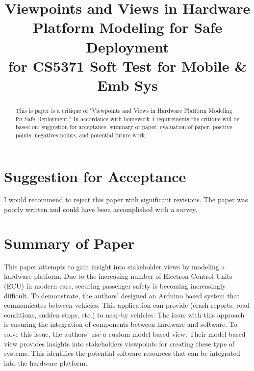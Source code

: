\documentclass[conference]{IEEEtran}
\begin{document}
\title{Viewpoints and Views in Hardware Platform Modeling for Safe Deployment\\
for CS5371 Soft Test for Mobile \& Emb Sys}

\author{
}

\maketitle

\begin{abstract}
This is paper is a critique of "Viewpoints and Views in Hardware Platform Modeling for Safe Deployment." In accordance with homework 4 requirements the critique will be based on: suggestion for acceptance, summary of paper, evaluation of paper, positive points, negatives points, and potential future work. 
\end{abstract}

\IEEEpeerreviewmaketitle

\section{Suggestion for Acceptance}
I would recommend to reject this paper with significant revisions. The paper was poorly written and could have been accomplished with a survey. 

\section{Summary of Paper}
This paper attempts to gain insight into stakeholder views by modeling a hardware platform. Due to the increasing number of Electron Control Units (ECU) in modern cars, securing passenger safety is becoming increasingly difficult. To demonstrate, the authors' designed an Arduino based system that communicates between vehicles. This application can provide (crash reports, road conditions, sudden stops, etc.) to near-by vehicles. The issue with this approach is ensuring the integration of components between hardware and software. To solve this issue, the authors' use a custom model based view. Their model based view provides insights into stakeholders viewpoints for creating these type of systems. This identifies the potential software resources that can be integrated into the hardware platform. 
\end{document}
